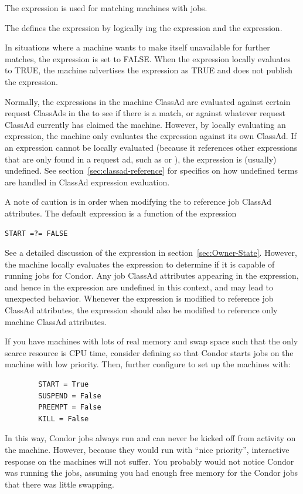 The  expression is used for
matching machines with jobs.

The  defines the
 expression by logically ing the 
 expression and the 
expression. 

In situations where a machine wants to make itself
unavailable for further matches, the 
expression is set to FALSE.  
When the  expression locally evaluates to TRUE, the
machine advertises the  expression as TRUE and
does not publish the  expression.

Normally, the expressions in the machine ClassAd are evaluated against
certain request ClassAds in the  to see if there is
a match, or against whatever request ClassAd currently has claimed the
machine.  However, by locally evaluating an expression, the machine only
evaluates the expression against its own ClassAd.  If an expression
cannot be locally evaluated (because it references other expressions
that are only found in a request ad, such as  or
), the expression is (usually) undefined.
See section~\ref{sec:classad-reference} for specifics on
how undefined terms are handled in ClassAd expression evaluation. 

A note of caution is in order when modifying the  to
reference job ClassAd attributes.  The default 
expression is a function of the  expression
\begin{verbatim}
START =?= FALSE
\end{verbatim}
See a detailed discussion of the  expression in
section~\ref{sec:Owner-State}.  However, the machine locally
evaluates the  expression to determine if it is
capable of running jobs for Condor.  Any job ClassAd attributes
appearing in the  expression, and hence in the
 expression are undefined in this context, and may
lead to unexpected behavior.  Whenever the  expression
is modified to reference job ClassAd attributes, the
 expression should also be modified to reference
only machine ClassAd attributes.

\Note If you have machines with lots of real memory and swap space such
that the only scarce resource is CPU time, consider
defining  
so that Condor starts jobs on the machine with low priority.
Then, further configure to set up the machines with:
\begin{verbatim}
        START = True
        SUSPEND = False
        PREEMPT = False
        KILL = False
\end{verbatim}
In this way, Condor jobs always run and can never be kicked off
from activity on the machine. 
However, because they would run with ``nice priority'', interactive 
response on the machines will not suffer.
You probably would not notice Condor was running the jobs, 
assuming you had enough free memory for the Condor jobs that there
was little swapping.

